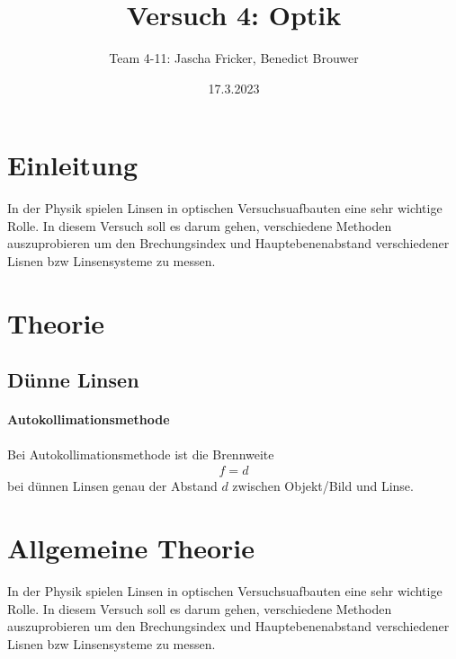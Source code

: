 \documentclass[11pt, a4paper]{article}
\title{Versuch 4: Optik}
\author{Team 4-11: Jascha Fricker, Benedict Brouwer}
\date{17.3.2023}
\begin{document}
    \def\Dimline[#1][#2][#3]{
        \begin{scope}[>=latex] %
            \draw let \p1=#1, \p2=#2, \n0={veclen(\x2-\x1,\y2-\y1)} in [|<->|,
            decoration={markings, %
                    mark=at position 0.5 with {\node[#3] at (0,0) {\DimScale{\n0}};},
            },
            postaction=decorate] #1 -- #2 ;
        \end{scope}
    }

    \def\DimScale#1{\pgfmathparse{round(#1/28.4*10.0)/10.0}\pgfmathresult cm}

    \maketitle

    \tableofcontents

    \newpage

    \section{Einleitung}
    In der Physik spielen Linsen in optischen Versuchsuafbauten eine sehr wichtige Rolle. In diesem Versuch soll es darum gehen, verschiedene 
    Methoden auszuprobieren um den Brechungsindex und Hauptebenenabstand verschiedener Lisnen bzw Linsensysteme zu messen.


    \section{Theorie}

    \subsection{Dünne Linsen}
    \paragraph{Autokollimationsmethode}
    Bei Autokollimationsmethode ist die Brennweite
    \begin{align}
        f = d \label{eq:auto}
    \end{align}
    bei dünnen Linsen genau der Abstand $d$ zwischen Objekt/Bild und Linse.

    \section{Allgemeine Theorie}
    \FloatBarrier
    In der Physik spielen Linsen in optischen Versuchsuafbauten eine sehr wichtige Rolle. In diesem Versuch soll es darum gehen, verschiedene 
    Methoden auszuprobieren um den Brechungsindex und Hauptebenenabstand verschiedener Lisnen bzw Linsensysteme zu messen.
\end{document}
